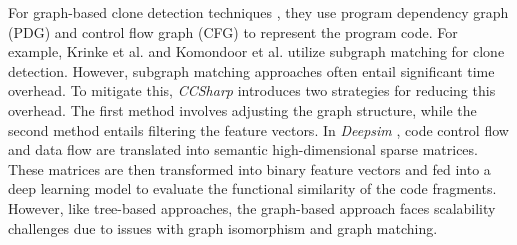 For graph-based clone detection techniques \cite{krinke2001duplix, komondoor2001pdgdup, wang2017ccsharp, zhao2018deepsim, wu2020scdetector, zou2020ccgraph}, they use program dependency graph (PDG) and control flow graph (CFG) to represent the program code. 
For example, Krinke et al. \cite{krinke2001duplix} and Komondoor et al. \cite{komondoor2001pdgdup} utilize subgraph matching for clone detection. 
However, subgraph matching approaches often entail significant time overhead. 
To mitigate this, \emph{CCSharp} \cite{wang2017ccsharp} introduces two strategies for reducing this overhead. 
The first method involves adjusting the graph structure, while the second method entails filtering the feature vectors. 
In \emph{Deepsim} \cite{zhao2018deepsim}, code control flow and data flow are translated into semantic high-dimensional sparse matrices. These matrices are then transformed into binary feature vectors and fed into a deep learning model to evaluate the functional similarity of the code fragments.
However, like tree-based approaches, the graph-based approach faces scalability challenges due to issues with graph isomorphism and graph matching.




